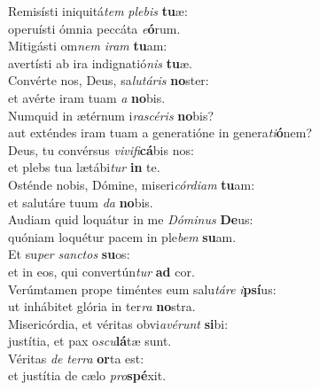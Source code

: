 \evenverse Remisísti iniquitá\textit{tem} \textit{ple}\textit{bis} \textbf{tu}æ:~\*\\
\evenverse operuísti ómnia peccáta \textit{e}\textbf{ó}rum.\\
\oddverse Mitigásti om\textit{nem} \textit{i}\textit{ram} \textbf{tu}am:~\*\\
\oddverse avertísti ab ira indignatió\textit{nis} \textbf{tu}æ.\\
\evenverse Convérte nos, Deus, sa\textit{lu}\textit{tá}\textit{ris} \textbf{no}ster:~\*\\
\evenverse et avérte iram tuam \textit{a} \textbf{no}bis.\\
\oddverse Numquid in ætérnum i\textit{ra}\textit{scé}\textit{ris} \textbf{no}bis?~\*\\
\oddverse aut exténdes iram tuam a generatióne in genera\textit{ti}\textbf{ó}nem?\\
\evenverse Deus, tu convérsus \textit{vi}\textit{vi}\textit{fi}\textbf{cá}bis nos:~\*\\
\evenverse et plebs tua lætábi\textit{tur} \textbf{in} te.\\
\oddverse Osténde nobis, Dómine, miseri\textit{cór}\textit{di}\textit{am} \textbf{tu}am:~\*\\
\oddverse et salutáre tuum \textit{da} \textbf{no}bis.\\
\evenverse Audiam quid loquátur in me \textit{Dó}\textit{mi}\textit{nus} \textbf{De}us:~\*\\
\evenverse quóniam loquétur pacem in ple\textit{bem} \textbf{su}am.\\
\oddverse Et su\textit{per} \textit{san}\textit{ctos} \textbf{su}os:~\*\\
\oddverse et in eos, qui convertún\textit{tur} \textbf{ad} cor.\\
\evenverse Verúmtamen prope timéntes eum salu\textit{tá}\textit{re} \textit{i}\textbf{psí}us:~\*\\
\evenverse ut inhábitet glória in ter\textit{ra} \textbf{no}stra.\\
\oddverse Misericórdia, et véritas obvi\textit{a}\textit{vé}\textit{runt} \textbf{si}bi:~\*\\
\oddverse justítia, et pax o\textit{scu}\textbf{lá}tæ sunt.\\
\evenverse Véritas \textit{de} \textit{ter}\textit{ra} \textbf{or}ta est:~\*\\
\evenverse et justítia de cælo \textit{pro}\textbf{spé}xit.\\
